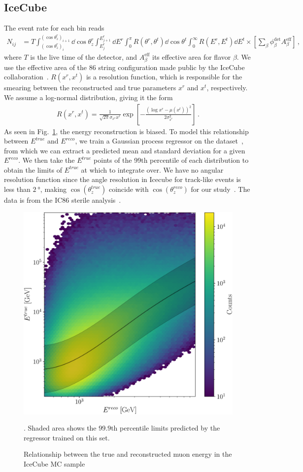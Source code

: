 \documentclass[draft=True]{revtex4-2}
\newcommand{\zreco}{\ensuremath{\cos{(\theta_z^{reco})}}}
\newcommand{\ztrue}{\ensuremath{\cos{(\theta_z^{true})}}}
\newcommand{\Ereco}{E^{reco}}
\newcommand{\Etrue}{E^{true}}
\begin{document}
\subsection{IceCube}\label{ch:ICmethod}
The event rate for each bin reads
\begin{align}\label{eq:ICevents}
    N_{ij} &= T \int_{(\cos{\theta_z^r})_i}^{(\cos{\theta_z^r})_{i+1}} \dd \cos{\theta^r_z} \int_{E^r_{j}}^{E^r_{j+1}} \dd E^r \int_0^\pi R(\theta^r,\theta^t) \dd \cos{\theta^t} \int_0^\infty R(E^r,E^t) \dd E^t
    \times \left[ \sum_\beta \phi_\beta^\text{det}  A^\text{eff}_\beta\right]\,,
\end{align}
where $T$ is the live time of the detector, and $A^\text{eff}_\beta$ its effective area for flavor $\beta$. We use the effective area of the 86 string configuration made public by the IceCube collaboration~\cite{ICaeff}. $R(x^r,x^t)$ is a resolution function, 
which is responsible for the smearing between the reconstructed and true parameters $x^r$ and $x^t$, respectively. We assume a log-normal distribution, giving it the form 
\begin{align}
    R(x^r, x^t) = \frac{1}{\sqrt{2\pi} \sigma_{x^r}x^r} \exp\left[-\frac{(\log x^r-\mu(x^t))^2}{2\sigma_{x^r}^2}\right]\,.
\end{align}
As seen in Fig.~\ref{fig:IC_MC_counts}, the energy reconstruction is biased. To model this relationship between $\Etrue$ and $\Ereco$, we train a Gaussian process regressor on the dataset~\cite{IC2016}, from which
we can extract a predicted mean and standard deviation for a given $E^{reco}$. We then take the $\Etrue$ points of the 99th percentile of each distribution to obtain
the limits of $\Etrue$ at which to integrate over. We have no angular resolution function since the angle resolution in Icecube for track-like events is less than $\SI{2}{\degree}$, making $\ztrue$ coincide with $\zreco$ for our study~\cite{IC2020}. 
The data is from the IC86 sterile analysis~\cite{IC2020}.
\begin{figure}[!tb]
    \begin{center}
       \includegraphics[width=0.4\linewidth]{figures/IC_MC_gpr.pdf} %
    \end{center}
    \caption{Relationship between the true and reconstructed muon energy in the IceCube MC sample~\cite{IC2016}}\label{fig:IC_MC_counts}. Shaded area shows the $99.9$th percentile limits predicted by the regressor trained on this set.
 \end{figure}
\end{document}
